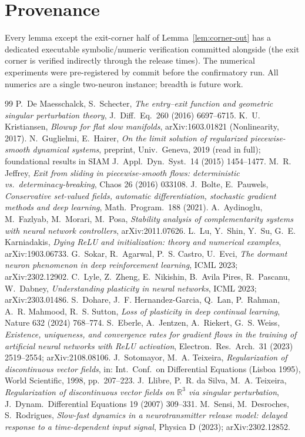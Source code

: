 \documentclass[11pt]{article}
\begin{document}
\section*{Provenance}
Every lemma except the exit-corner half of Lemma~\ref{lem:corner-out} has a
dedicated executable symbolic/numeric verification committed alongside (the
exit corner is verified indirectly through the release times). The numerical
experiments were pre-registered by commit before the confirmatory run. All
numerics are a single two-neuron instance; breadth is future work.

\begin{thebibliography}{99}
 P.~De Maesschalck, S.~Schecter, \emph{The entry--exit function
and geometric singular perturbation theory}, J.~Diff.~Eq.\ 260 (2016) 6697--6715.
 K.~U. Kristiansen, \emph{Blowup for flat slow manifolds},
arXiv:1603.01821 (Nonlinearity, 2017).
 N.~Guglielmi, E.~Hairer, \emph{On the limit solution of regularized
piecewise-smooth dynamical systems}, preprint, Univ.\ Geneva, 2019 (read in
full); foundational results in SIAM J.~Appl.~Dyn.~Syst.\ 14 (2015) 1454--1477.
 M.~R. Jeffrey, \emph{Exit from sliding in piecewise-smooth
flows: deterministic vs.\ determinacy-breaking}, Chaos 26 (2016) 033108.
 J.~Bolte, E.~Pauwels, \emph{Conservative set-valued fields,
automatic differentiation, stochastic gradient methods and deep learning},
Math.~Program.\ 188 (2021).
 A.~Aydinoglu, M.~Fazlyab, M.~Morari, M.~Posa, \emph{Stability
analysis of complementarity systems with neural network controllers},
arXiv:2011.07626.
 L.~Lu, Y.~Shin, Y.~Su, G.~E. Karniadakis, \emph{Dying ReLU and
initialization: theory and numerical examples}, arXiv:1903.06733.
 G.~Sokar, R.~Agarwal, P.~S. Castro, U.~Evci, \emph{The dormant
neuron phenomenon in deep reinforcement learning}, ICML 2023; arXiv:2302.12902.
 C.~Lyle, Z.~Zheng, E.~Nikishin, B.~Avila Pires, R.~Pascanu,
W.~Dabney, \emph{Understanding plasticity in neural networks}, ICML 2023;
arXiv:2303.01486.
 S.~Dohare, J.~F. Hernandez-Garcia, Q.~Lan, P.~Rahman,
A.~R. Mahmood, R.~S. Sutton, \emph{Loss of plasticity in deep continual
learning}, Nature 632 (2024) 768--774.
 S.~Eberle, A.~Jentzen, A.~Riekert, G.~S. Weiss,
\emph{Existence, uniqueness, and convergence rates for gradient flows in the
training of artificial neural networks with ReLU activation},
Electron.~Res.~Arch.\ 31 (2023) 2519--2554; arXiv:2108.08106.
 J.~Sotomayor, M.~A. Teixeira, \emph{Regularization of
discontinuous vector fields}, in: Int.\ Conf.\ on Differential Equations
(Lisboa 1995), World Scientific, 1998, pp.~207--223.
 J.~Llibre, P.~R. da Silva, M.~A. Teixeira, \emph{Regularization
of discontinuous vector fields on $\mathbb{R}^3$ via singular perturbation},
J.~Dynam.~Differential Equations 19 (2007) 309--331.
 M.~Sensi, M.~Desroches, S.~Rodrigues, \emph{Slow-fast dynamics
in a neurotransmitter release model: delayed response to a time-dependent input
signal}, Physica D (2023); arXiv:2302.12852.
\end{thebibliography}
\end{document}
